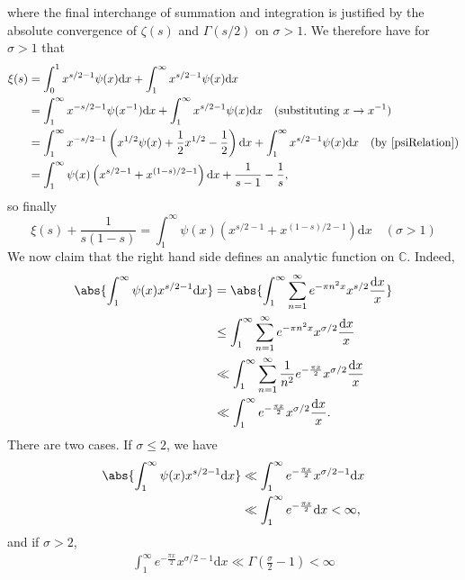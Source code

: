 where the final interchange of summation and integration is justified by the absolute convergence of $\zeta(s)$ and $\Gamma(s/2)$ on $\sigma > 1$. We therefore have for $\sigma > 1$ that
\begin{align}
\xi(s) &= \int_{0}^{1}x^{s/2 - 1} \psi(x) \mathrm{d} x + \int_{1}^{\infty} x^{s/2 - 1}\psi(x) \mathrm{d} x \nonumber \\
&= \int_{1}^{\infty}x^{-s/2 - 1}\psi(x^{-1}) \mathrm{d} x + \int_{1}^{\infty} x^{s/2 - 1}\psi(x) \mathrm{d} x \quad (\textrm{substituting} \ x \rightarrow x^{-1})\nonumber \\
&= \int_{1}^{\infty} x^{-s/2 - 1} \left(x^{1/2}\psi(x) + \frac12 x^{1/2} - \frac12 \right) \mathrm{d} x + \int_{1}^{\infty} x^{s/2 - 1}\psi(x) \mathrm{d} x \quad (\textrm{by \ref{psiRelation}}) \nonumber \\
&= \int_{1}^{\infty}\psi(x) \left(x^{s/2 - 1} + x^{(1-s)/2 - 1} \right) \mathrm{d} x + \frac{1}{s - 1} - \frac{1}{s}, \nonumber
\end{align}
so finally
\begin{equation}
\label{xiMeromorphic}
    \xi(s) + \frac{1}{s(1-s)} = \int_{1}^{\infty}\psi(x) \left(x^{s/2 - 1} + x^{(1-s)/2 - 1} \right) \mathrm{d} x \quad (\sigma > 1) \nonumber
\end{equation}
We now claim that the right hand side defines an analytic function on $\mathbb{C}$. Indeed, 
\begin{align}
\abs{\int_{1}^{\infty} \psi(x) x^{s/2 - 1} \mathrm{d}x} &= \abs{\int_{1}^{\infty} \sum_{n=1}^{\infty} e^{-\pi n^{2} x} x^{s/2} \frac{\mathrm{d}x}{x}} \nonumber \\
&\leq \int_{1}^{\infty} \sum_{n=1}^{\infty} e^{-\pi n^{2} x} x^{\sigma/2} \frac{\mathrm{d}x}{x} \nonumber \\
& \ll \int_{1}^{\infty} \sum_{n=1}^{\infty} \frac{1}{n^2}  e^{-\frac{\pi x}{2}} x^{\sigma/2} \frac{\mathrm{d} x}{x} \nonumber \\
& \ll \int_{1}^{\infty} e^{-\frac{\pi x}{2}} x^{\sigma/2} \frac{\mathrm{d} x}{x}. \nonumber
\end{align}
There are two cases. If $\sigma \leq 2$, we have 
\begin{align}
\abs{\int_{1}^{\infty} \psi(x) x^{s/2 - 1} \mathrm{d}x} &\ll \int_{1}^{\infty} e^{-\frac{\pi x}{2}} x^{\sigma/2 - 1} \mathrm{d} x \nonumber \\ 
& \ll \int_{1}^{\infty} e^{-\frac{\pi x}{2}}\mathrm{d}x < \infty, \nonumber
\end{align}
and if $\sigma > 2$, 
\begin{align}
\int_{1}^{\infty} e^{-\frac{\pi x}{2}} x^{\sigma/2 - 1} \mathrm{d} x \ll \Gamma(\frac{\sigma}{2} - 1) < \infty \nonumber
\end{align}
